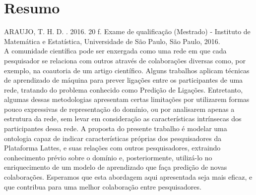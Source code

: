 \documentclass[11pt,twoside,a4paper]{book}
\begin{document}
%
%
%
%


\chapter*{Resumo}

\noindent ARAUJO, T. H. D. \textbf{\mydocumenttitle{}}.
2016. 20 f. Exame de qualificação (Mestrado) - Instituto de Matemática e Estatística,
Universidade de São Paulo, São Paulo, 2016.
\\

A comunidade científica pode ser enxergada como uma rede em que cada pesquisador se relaciona com outros através de colaborações diversas como, por exemplo, na coautoria de um artigo científico. Alguns trabalhos aplicam técnicas de aprendizado de máquina para prever ligações entre os participantes de uma rede, tratando do problema conhecido como Predição de Ligações. Entretanto, algumas dessas metodologias apresentam certas limitações por utilizarem formas pouco expressivas de representação do domínio, ou por analisarem apenas a estrutura da rede, sem levar em consideração as características intrínsecas dos participantes dessa rede. A proposta do presente trabalho é modelar uma ontologia capaz de indicar características próprias dos pesquisadores da Plataforma Lattes, e suas relações com outros pesquisadores, extraindo conhecimento prévio sobre o domínio e, posteriormente, utilizá-lo no enriquecimento de um modelo de aprendizado que faça predição de novas colaborações. Esperamos que esta abordagem aqui apresentada seja mais eficaz, e que contribua para uma melhor colaboração entre pesquisadores.
\\
\end{document}
